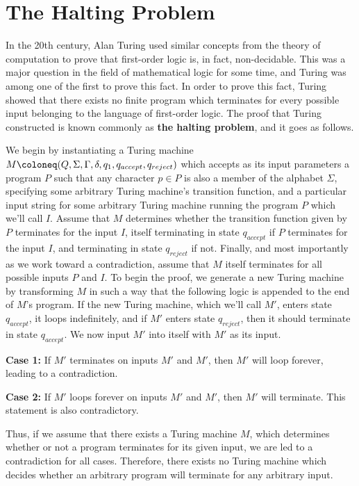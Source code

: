 \documentclass{article}
\begin{document}
\section{The Halting Problem}
In the 20th century, Alan Turing used similar concepts from the theory of computation to prove that first-order logic is, in fact, non-decidable.  This was a major question in the field of mathematical logic for some time, and Turing was among one of the first to prove this fact.  In order to prove this fact, Turing showed that there exists no finite program which terminates for every possible input belonging to the language of first-order logic.  The proof that Turing constructed is known commonly as \textbf{the halting problem}, and it goes as follows. \cite{7}
\begin{prf}
	We begin by instantiating a Turing machine $M \coloneq (Q, \Sigma, \Gamma, \delta, q_{1}, \newline q_{accept}, q_{reject})$ which accepts as its input parameters a program $P$ such that any character $p \in P$ is also a member of the alphabet $\Sigma$, specifying some arbitrary Turing machine's transition function, and a particular input string for some arbitrary Turing machine running the program $P$ which we'll call $I$.  Assume that $M$ determines whether the transition function given by $P$ terminates for the input $I$, itself terminating in state $q_{accept}$ if $P$ terminates for the input $I$, and terminating in state $q_{reject}$ if not.  Finally, and most importantly as we work toward a contradiction, assume that $M$ itself terminates for all possible inputs $P$ and $I$.  To begin the proof, we generate a new Turing machine by transforming $M$ in such a way that the following logic is appended to the end of $M$'s program. If the new Turing machine, which we'll call $M'$, enters state $q_{accept}$, it loops indefinitely, and if $M'$ enters state $q_{reject}$, then it should terminate in state $q_{accept}$.  We now input $M'$ into itself with $M'$ as its input.\\
\begin{adjustwidth}{0.5cm}{}
	\textbf{Case 1:} If $M'$ terminates on inputs $M'$ and $M'$, then $M'$ will loop forever, leading to a contradiction.\\
\end{adjustwidth}
\begin{adjustwidth}{0.5cm}{}
	\textbf{Case 2:} If $M'$ loops forever on inputs $M'$ and $M'$, then $M'$ will terminate. This statement is also contradictory.\\
\end{adjustwidth}
	\noindent Thus, if we assume that there exists a Turing machine $M$, which determines whether or not a program terminates for its given input, we are led to a contradiction for all cases. Therefore, there exists no Turing machine which decides whether an arbitrary program will terminate for any arbitrary input.\cite{8} \qedsymbol
\end{prf}
\end{document}
